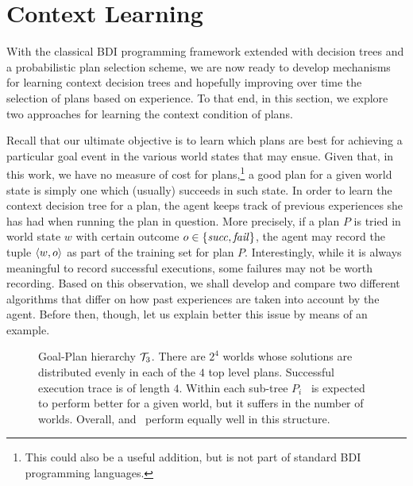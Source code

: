\section{Context Learning}\label{sec:context_learning}

\newcommand{\success}{\mbox{\emph{succ}}}
\newcommand{\failure}{\mbox{\emph{fail}}}

With the classical BDI programming framework extended with decision trees and a
probabilistic plan selection scheme, we are now ready to develop mechanisms for
learning context decision trees and hopefully improving over time the selection
of plans based on experience.
To that end, in this section, we explore two approaches for learning the context
condition of plans.



Recall that our ultimate objective is to learn which plans are best for achieving
a particular goal event in the various world states that may ensue. Given that,
in this work, we have no measure of cost for plans,\footnote{This could also be a
useful addition, but is not part of standard BDI programming languages.} a good
plan for a given world state is simply one which (usually) succeeds in such
state. In order to learn the context decision tree for a plan, the agent keeps
track of previous experiences she has had when running the plan in question. More
precisely, if a plan $P$ is tried in world state $w$ with certain outcome $o \in
\{\success,\failure\}$, the agent may record the tuple $\langle w,o \rangle$ as part of
the training set for plan $P$.
Interestingly, while it is always meaningful to record successful executions,
some failures may not be worth recording. Based on this observation, we shall
develop and compare two different algorithms that differ on how past experiences
are taken into account by the agent. Before then, though, let us explain better
this issue by means of an example.
 

\begin{figure}[t]
\begin{center}

\end{center}
\caption{Goal-Plan hierarchy ${\mathcal{T}}_3$. There are $2^4$ worlds whose solutions are distributed evenly in each of the $4$ top level plans. Successful execution trace is of length $4$. Within each sub-tree $P_i$ \BUL\ is expected to perform better for a given world, but it suffers in the number of worlds. Overall, \CL and \BUL\ perform equally well in this structure.}
\label{fig:T3}
\end{figure}



